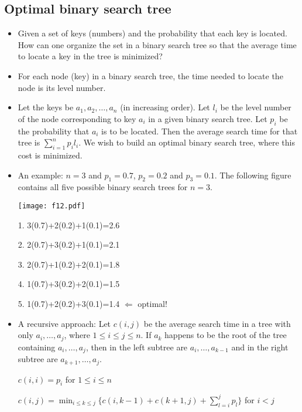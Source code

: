 \documentclass{article}
\begin{document}
\subsection{Optimal binary search tree}


\begin{itemize}

\item Given a set of keys (numbers) and the probability that each key
is located. How can one organize the set in a binary search tree so that
the average time to locate a key in the tree is minimized?

\item For each node (key) in a binary search tree, the time needed to
locate the node is its level number. 

\item Let the keys be $a_1, a_2,\ldots,a_n$ (in increasing order).
Let $l_i$ be the level number of the node corresponding to key $a_i$
in a given binary search tree. Let $p_i$ be the probability that
$a_i$ is to be located. Then the average search time for that tree
is $\sum_{i=1}^n p_il_i$. We wish to build an optimal binary search
tree, where this cost is minimized.

\item An example: $n=3$ and $p_1=0.7$, $p_2=0.2$ and $p_3=0.1$.
The following figure contains all five possible binary search trees
for $n=3$.

\vskip 0.25cm
\begin{center}
\texttt{[image: f12.pdf]}
\end{center}

1. 3(0.7)+2(0.2)+1(0.1)=2.6

2. 2(0.7)+3(0.2)+1(0.1)=2.1

3. 2(0.7)+1(0.2)+2(0.1)=1.8

4. 1(0.7)+3(0.2)+2(0.1)=1.5

5. 1(0.7)+2(0.2)+3(0.1)=1.4 $\Leftarrow$ optimal!

\item A recursive approach: Let $c(i,j)$ be the average search time
in a tree with only $a_i,\ldots,a_j$, where $1\le i\le j\le n$.
If $a_k$ happens to be the root of the tree containing $a_i,\ldots,a_j$,
then in the left subtree are $a_i,\ldots,a_{k-1}$ and in
the right subtree are $a_{k+1},\ldots,a_j$.

$c(i,i)=p_i$ for $1\le i\le n$

$c(i,j)=\min_{i\le k\le j}\{c(i,k-1)+c(k+1,j)+\sum_{l=i}^jp_l\}$ for $i<j$


\end{itemize}
\end{document}
